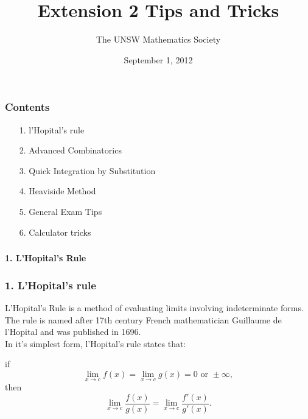 \documentclass{beamer}
\title[Extension 2 Tips and Tricks]{Extension 2 Tips and Tricks}
\author[UNSW Mathsoc]{The UNSW Mathematics Society}
\institute[UNSW]
{

\medskip

}
\date{September 1, 2012}
\begin{document}
%
\begin{frame}[t, plain]
\titlepage
\end{frame}


\begin{frame}
	\frametitle{Contents}
{\bf
\begin{enumerate}
\item[1. ] l'Hopital's rule
\item[2. ] Advanced Combinatorics
\item[3. ] Quick Integration by Substitution
\item[4. ] Heaviside Method
\item[5. ] General Exam Tips
\item[6. ] Calculator tricks
\end{enumerate}
}

\end{frame}



\begin{frame}
	\frametitle{}
{\bf \LARGE 1. L'Hopital's Rule}

\end{frame}



\begin{frame}
\frametitle{1. L'Hopital's rule}

L'Hopital's Rule is a method of evaluating limits involving indeterminate forms. The rule is named after 17th century French mathematician Guillaume de l'Hopital and was published in 1696.\\[2mm]
In it's simplest form, l'Hopital's rule states that:

	\begin{block}{}
	\hspace{20mm}if 
	\[
\lim_{x\rightarrow c} f(x) = \lim_{x\rightarrow c} g(x) = 0 \text{ or } \pm \infty ,
\]
		\hspace{20mm}then
\[
\lim_{x\rightarrow c} \frac{f(x)}{g(x)} = \lim_{x\rightarrow c} \frac{f'(x)}{g'(x)}.
\]
	\end{block}



\end{frame}



\end{document}
